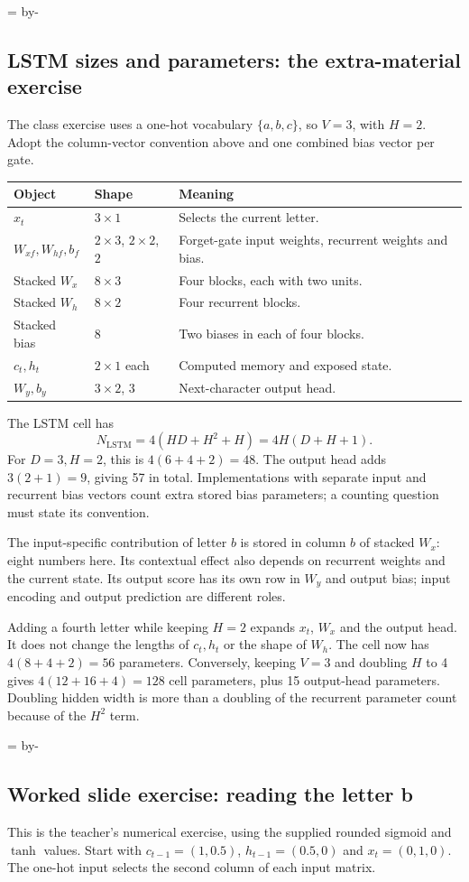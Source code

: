 \documentclass[11pt]{article}
\newcommand{\newsubsection}[1]{\par\begingroup\skip0=\pagegoal\advance\skip0 by-\pagetotal\ifdim\skip0<12\baselineskip\newpage\fi\endgroup\subsection{#1}}
\begin{document}
\newsubsection{LSTM sizes and parameters: the extra-material exercise}
The class exercise uses a one-hot vocabulary $\{a,b,c\}$, so $V=3$, with $H=2$. Adopt the column-vector convention above and one combined bias vector per gate.
\begin{longtable}{@{}P{.25\textwidth}P{.20\textwidth}P{.45\textwidth}@{}}
\toprule Object & Shape & Meaning\\\midrule\endhead
$x_t$ & $3\times1$ & Selects the current letter.\\
$W_{xf},W_{hf},b_f$ & $2\times3$, $2\times2$, $2$ & Forget-gate input weights, recurrent weights and bias.\\
Stacked $W_x$ & $8\times3$ & Four blocks, each with two units.\\
Stacked $W_h$ & $8\times2$ & Four recurrent blocks.\\
Stacked bias & $8$ & Two biases in each of four blocks.\\
$c_t,h_t$ & $2\times1$ each & Computed memory and exposed state.\\
$W_y,b_y$ & $3\times2$, $3$ & Next-character output head.\\\bottomrule
\end{longtable}
The LSTM cell has
\[
\boxed{N_{\mathrm{LSTM}}=4(HD+H^2+H)=4H(D+H+1).}
\]
For $D=3,H=2$, this is $4(6+4+2)=48$. The output head adds $3(2+1)=9$, giving 57 in total. Implementations with separate input and recurrent bias vectors count extra stored bias parameters; a counting question must state its convention.

The input-specific contribution of letter $b$ is stored in column $b$ of stacked $W_x$: eight numbers here. Its contextual effect also depends on recurrent weights and the current state. Its output score has its own row in $W_y$ and output bias; input encoding and output prediction are different roles.

Adding a fourth letter while keeping $H=2$ expands $x_t$, $W_x$ and the output head. It does not change the lengths of $c_t,h_t$ or the shape of $W_h$. The cell now has $4(8+4+2)=56$ parameters. Conversely, keeping $V=3$ and doubling $H$ to 4 gives $4(12+16+4)=128$ cell parameters, plus 15 output-head parameters. Doubling hidden width is more than a doubling of the recurrent parameter count because of the $H^2$ term.

\newsubsection{Worked slide exercise: reading the letter b}
This is the teacher's numerical exercise, using the supplied rounded sigmoid and $\tanh$ values. Start with $c_{t-1}=(1,0.5)$, $h_{t-1}=(0.5,0)$ and $x_t=(0,1,0)$. The one-hot input selects the second column of each input matrix.
\end{document}
